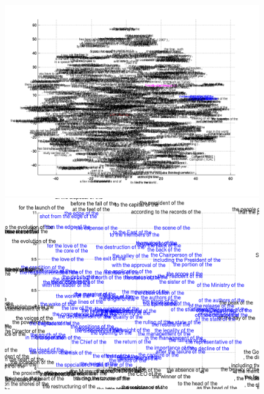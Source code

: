 \begin{figure}[ht]
    \centering
    \begin{minipage}{0.48\textwidth}
        \centering
        \includegraphics[width=0.99\textwidth]{figures/phrase_all.png}
    \end{minipage}
    \hfill
    \begin{minipage}{0.48\textwidth}
        \centering
        \includegraphics[width=0.99\textwidth]{figures/phrase_zoom1.png}
    \end{minipage}
    \\
    \begin{minipage}{0.48\textwidth}
        \centering

\end{minipage}
\end{figure}
